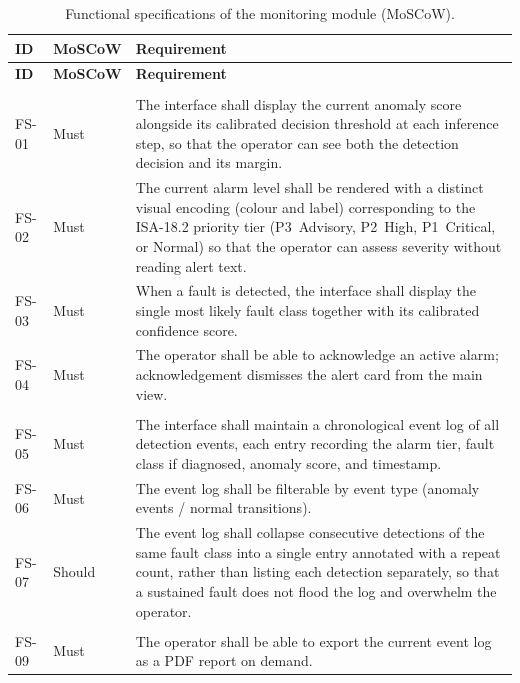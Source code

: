 \newpage
\begin{longtable}{@{}llp{}@{}}
\caption{Functional specifications of the monitoring module (MoSCoW).}
\label{tab:deployment-func-specs} \\
\toprule
\textbf{ID} & \textbf{MoSCoW} & \textbf{Requirement} \\
\midrule
\endfirsthead
\toprule
\textbf{ID} & \textbf{MoSCoW} & \textbf{Requirement} \\
\midrule
\endhead
\midrule
\endfoot
\bottomrule
\endlastfoot
\multicolumn{3}{@{}l}{\textit{Real-Time Monitoring}} \\
\addlinespace
FS-01 & Must & The interface shall display the current anomaly score alongside its calibrated decision threshold at each inference step, so that the operator can see both the detection decision and its margin. \\
\addlinespace
FS-02 & Must & The current alarm level shall be rendered with a distinct visual encoding (colour and label) corresponding to the ISA-18.2 priority tier (P3~Advisory, P2~High, P1~Critical, or Normal) so that the operator can assess severity without reading alert text. \\
\addlinespace
FS-03 & Must & When a fault is detected, the interface shall display the single most likely fault class together with its calibrated confidence score. \\
\addlinespace
FS-04 & Must & The operator shall be able to acknowledge an active alarm; acknowledgement dismisses the alert card from the main view. \\
\addlinespace
\multicolumn{3}{@{}l}{\textit{Event Log}} \\
\addlinespace
FS-05 & Must & The interface shall maintain a chronological event log of all detection events, each entry recording the alarm tier, fault class if diagnosed, anomaly score, and timestamp. \\
\addlinespace
FS-06 & Must & The event log shall be filterable by event type (anomaly events / normal transitions). \\
\addlinespace
FS-07 & Should & The event log shall collapse consecutive detections of the same fault class into a single entry annotated with a repeat count, rather than listing each detection separately, so that a sustained fault does not flood the log and overwhelm the operator. \\
\addlinespace
\multicolumn{3}{@{}l}{\textit{Reporting}} \\
\addlinespace
FS-09 & Must & The operator shall be able to export the current event log as a PDF report on demand. \\

\end{longtable}
